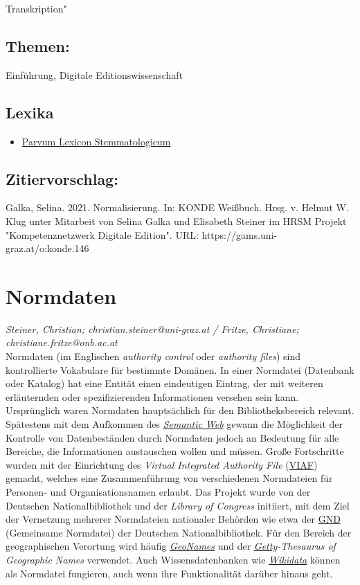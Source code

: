 \documentclass{article}
\begin{document}
{                           Transkription"}\subsection*{Themen:}Einführung, Digitale Editionswissenschaft\subsection*{Lexika}\begin{itemize}\item \href{https://wiki.helsinki.fi/display/stemmatology/Normalisation}{Parvum Lexicon Stemmatologicum}\end{itemize}\subsection*{Zitiervorschlag:}Galka, Selina. 2021. Normalisierung. In: KONDE Weißbuch. Hrsg. v. Helmut W. Klug unter Mitarbeit von Selina Galka und Elisabeth Steiner im HRSM Projekt "Kompetenznetzwerk Digitale Edition". URL: https://gams.uni-graz.at/o:konde.146\newpage\section*{Normdaten} \emph{Steiner, Christian; christian.steiner@uni-graz.at / Fritze, Christiane; christiane.fritze@onb.ac.at }\\
        
    Normdaten (im Englischen \emph{authority control} oder \emph{authority files}) sind kontrollierte Vokabulare für bestimmte Domänen. In einer Normdatei (Datenbank oder Katalog) hat eine Entität einen eindeutigen Eintrag, der mit weiteren erläuternden oder spezifizierenden Informationen versehen sein kann. \\
            
        Ursprünglich waren Normdaten hauptsächlich für den Bibliotheksbereich relevant. Spätestens mit dem Aufkommen des \emph{\href{http://gams.uni-graz.at/o:konde.167}{Semantic Web}} gewann die Möglichkeit der Kontrolle von Datenbeständen durch Normdaten jedoch an Bedeutung für alle Bereiche, die Informationen austauschen wollen und müssen. Große Fortschritte wurden mit der Einrichtung des \emph{Virtual Integrated Authority File} (\href{http://gams.uni-graz.at/o:konde.111}{VIAF}) gemacht, welches eine Zusammenführung von verschiedenen Normdateien für Personen- und Organisationsnamen erlaubt. Das Projekt wurde von der Deutschen Nationalbibliothek und der \emph{Library of Congress} initiiert, mit dem Ziel der Vernetzung mehrerer Normdateien nationaler Behörden wie etwa der \href{http://gams.uni-graz.at/o:konde.109}{GND} (Gemeinsame Normdatei) der Deutschen Nationalbibliothek. Für den Bereich der geographischen Verortung wird häufig \emph{\href{http://gams.uni-graz.at/o:konde.107}{GeoNames}} und der \emph{\href{http://gams.uni-graz.at/o:konde.108}{Getty}}\emph{-Thesaurus of Geographic Names} verwendet. Auch Wissensdatenbanken wie \emph{\href{http://gams.uni-graz.at/o:konde.112}{Wikidata}} können als Normdatei fungieren, auch wenn ihre Funktionalität darüber hinaus geht. \\
            
\end{document}
